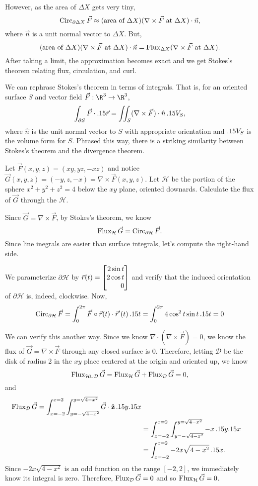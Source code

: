However, as the area of $\Delta X$ gets very tiny,
\[
	\operatorname{Circ}_{\partial \Delta X} \vec F \approx (\text{area of }\Delta X)(\nabla \times \vec F
	\text{ at }\Delta X)\cdot \vec n,
\]
where $\vec n$ is a unit normal vector to $\Delta X$.  But, 
\[ 
	(\text{area of }\Delta X)(\nabla \times \vec F
	\text{ at }\Delta X)\cdot \vec n = \operatorname{Flux}_{\Delta X}(\nabla \times \vec F\text{ at }\Delta X).
\]
After taking a limit, the approximation becomes exact and we get Stokes's theorem
relating flux, circulation, and curl.

\ThmStokes

We can rephrase Stokes's theorem in terms of integrals.  That is, for an oriented
surface $S$ and vector field $\vec F:\R^3\to\R^3$,
\[
	\int_{\partial S} \vec F\cdot .15\vec r = \iint_S (\nabla \times \vec F)\cdot
	\hat n\,.15 V_S,
\]
where $\hat n$ is the unit normal vector to $S$ with appropriate orientation and 
$.15 V_S$ is the volume form for $S$.  Phrased this way, there is a striking similarity
between Stokes's theorem and the divergence theorem.

\begin{example}
	Let $\vec F(x,y,z) = (xy,yz,-xz)$ and notice
	$\vec G(x,y,z) = (-y,z,-x) = \nabla \times \vec F(x,y,z)$.  Let $\mathcal H$
	be the portion of the sphere $x^2+y^2+z^2=4$ below the $xy$ plane, oriented downards.
	Calculate the flux of $\vec G$ through the $\mathcal H$.

	Since $\vec G=\nabla \times \vec F$, by Stokes's theorem, we know
	\[
		\operatorname{Flux}_{\mathcal H} \vec G = \operatorname{Circ}_{\partial \mathcal H} \vec F.
	\]
	Since line inegrals are easier than surface integrals, let's compute the right-hand side.

	We parameterize $\partial \mathcal H$ by $\vec r(t) = \mat{2\sin t\\2\cos t\\0}$ and verify that the induced
	orientation of $\partial \mathcal H$ is, indeed, clockwise.  Now,
	\[
		\operatorname{Circ}_{\partial \mathcal H}\vec F = \int_0^{2\pi} \vec F\circ \vec r(t)\cdot \vec r'(t)\,.15 t
		=\int_0^{2\pi} 4\cos^2t\sin t\,.15 t = 0
	\]

	We can verify this another way.  Since we know $\nabla \cdot (\nabla \times \vec F)=0$, we know the flux 
	of $\vec G=\nabla \times \vec F$ through any closed surface is $0$.  Therefore, letting $\mathcal D$
	be the disk of radius 2 in the $xy$ place centered at the origin and oriented up, we know
	\[
		\operatorname{Flux}_{\mathcal H\cup\mathcal D} \vec G = \operatorname{Flux}_{\mathcal H}\vec G+\operatorname{Flux}_{\mathcal D}\vec G = 0,
	\]
	and
	\begin{align*}
		\operatorname{Flux}_{\mathcal D}\vec G =\int_{x=-2}^{x=2}\int_{y=-\sqrt{4-x^2}}^{y=\sqrt{4-x^2}} \vec G\cdot {\hat {\mathbf z}} \,.15 y.15 x\\
		&=\int_{x=-2}^{x=2}\int_{y=-\sqrt{4-x^2}}^{y=\sqrt{4-x^2}} -x \,.15 y.15 x\\
		&=\int_{x=-2}^{x=2}-2x\sqrt{4-x^2} \,.15 x.
	\end{align*}
	Since $-2x\sqrt{4-x^2}$ is an odd function on the range $[-2,2]$, we immediately know its integral is zero.
	Therefore, $\operatorname{Flux}_{\mathcal D}\vec G=0$ and so $\operatorname{Flux}_{\mathcal H}\vec G=0$.
\end{example}



